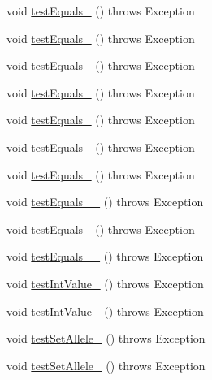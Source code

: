 \begin{DoxyCompactItemize}
\item 
void \hyperlink{classorg_1_1jgap_1_1impl_1_1_integer_gene_test_abae3edc0738dd56190be58c8af123e76}{test\-Equals\-\_} ()  throws Exception 
\item 
void \hyperlink{classorg_1_1jgap_1_1impl_1_1_integer_gene_test_af32fda8d5d496191c6cd80734466404e}{test\-Equals\-\_} ()  throws Exception 
\item 
void \hyperlink{classorg_1_1jgap_1_1impl_1_1_integer_gene_test_a313c21b2c7a03b3933024dd59612ed61}{test\-Equals\-\_} ()  throws Exception 
\item 
void \hyperlink{classorg_1_1jgap_1_1impl_1_1_integer_gene_test_ac4d32a70bc212b3bfd675e0e512a28f5}{test\-Equals\-\_} ()  throws Exception 
\item 
void \hyperlink{classorg_1_1jgap_1_1impl_1_1_integer_gene_test_ae3145b6e75931b4258b925289c8630e7}{test\-Equals\-\_} ()  throws Exception 
\item 
void \hyperlink{classorg_1_1jgap_1_1impl_1_1_integer_gene_test_a88233ae6b45ef921275b2a97119ef891}{test\-Equals\-\_} ()  throws Exception 
\item 
void \hyperlink{classorg_1_1jgap_1_1impl_1_1_integer_gene_test_a10ed74565938f11d5d47a1534da1347a}{test\-Equals\-\_} ()  throws Exception 
\item 
void \hyperlink{classorg_1_1jgap_1_1impl_1_1_integer_gene_test_acf4739596f865c1d3ab7ac3991919ea8}{test\-Equals\-\_\-\_} ()  throws Exception 
\item 
void \hyperlink{classorg_1_1jgap_1_1impl_1_1_integer_gene_test_a1b6452cc0cc1756f1c581efe3a4315f9}{test\-Equals\-\_} ()  throws Exception 
\item 
void \hyperlink{classorg_1_1jgap_1_1impl_1_1_integer_gene_test_a765667c1df140f4e476400df65b5022e}{test\-Equals\-\_\-\_} ()  throws Exception 
\item 
void \hyperlink{classorg_1_1jgap_1_1impl_1_1_integer_gene_test_ad2152cfedb1e473499e46d5039300d90}{test\-Int\-Value\-\_} ()  throws Exception 
\item 
void \hyperlink{classorg_1_1jgap_1_1impl_1_1_integer_gene_test_a1f482f6d09c6b082ca2b581a7a21eae4}{test\-Int\-Value\-\_} ()  throws Exception 
\item 
void \hyperlink{classorg_1_1jgap_1_1impl_1_1_integer_gene_test_ac85e0a672edd6cde6a9fd683f9a501ab}{test\-Set\-Allele\-\_} ()  throws Exception 
\item 
void \hyperlink{classorg_1_1jgap_1_1impl_1_1_integer_gene_test_abf005e628d999388483a1558e13fc494}{test\-Set\-Allele\-\_} ()  throws Exception 

\end{DoxyCompactItemize}

